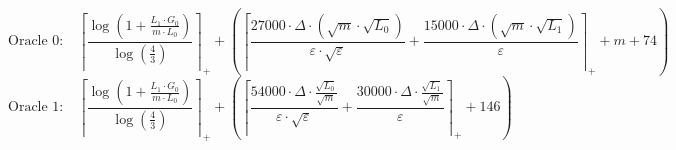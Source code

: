 \[\text{Oracle 0:}\quad \left\lceil \frac{\log\left(1 + \frac{L_1 \cdot G_0}{m \cdot L_0}\right)}{\log\left(\frac{4}{3}\right)} \right\rceil_{+} + \left(\left\lceil \frac{27000 \cdot \Delta \cdot \left(\sqrt{m} \cdot \sqrt{L_0}\right)}{\varepsilon \cdot \sqrt{\varepsilon}} + \frac{15000 \cdot \Delta \cdot \left(\sqrt{m} \cdot \sqrt{L_1}\right)}{\varepsilon} \right\rceil_{+} + m + 74\right)\]
\[\text{Oracle 1:}\quad \left\lceil \frac{\log\left(1 + \frac{L_1 \cdot G_0}{m \cdot L_0}\right)}{\log\left(\frac{4}{3}\right)} \right\rceil_{+} + \left(\left\lceil \frac{54000 \cdot \Delta \cdot \frac{\sqrt{L_0}}{\sqrt{m}}}{\varepsilon \cdot \sqrt{\varepsilon}} + \frac{30000 \cdot \Delta \cdot \frac{\sqrt{L_1}}{\sqrt{m}}}{\varepsilon} \right\rceil_{+} + 146\right)\]
